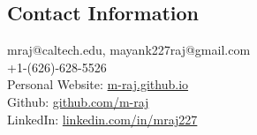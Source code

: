 \documentclass[margin, line]{res}
\begin{document}
\begin{resume}

\section{\sc Contact Information}

\begin{minipage}[t]{\linewidth}
mraj@caltech.edu, mayank227raj@gmail.com\\
+1-(626)-628-5526\\
Personal Website: \href{https://m-raj.github.io}{m-raj.github.io}\\
Github: \href{https://github.com/m-raj}{github.com/m-raj}\\
LinkedIn: \href{https://www.linkedin.com/in/mraj227}{linkedin.com/in/mraj227}
\end{minipage}










% 

% 
\end{resume}
\end{document}
